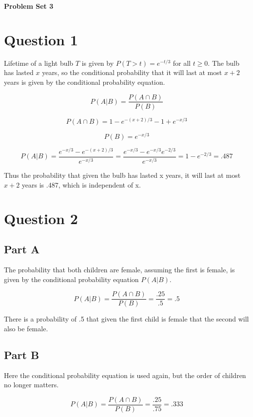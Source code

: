\documentclass[letterpaper]{article}
\begin{document}
\vspace*{6pt}

\noindent \textbf{\huge{Problem Set 3}}

\bigskip

\section*{Question 1}

Lifetime of a light bulb $T$ is given by $P(T>t)=e^{-t/3}$ for all $t \geq 0$. The bulb has lasted $x$ years, so the conditional probability that it will last at most $x + 2$ years is given by the conditional probability equation.

$$P(A|B) = \frac{P(A \cap B)}{P(B)}$$

$$P(A \cap B) = 1 - e^{-(x+2)/3} - 1 + e^{-x/3}$$

$$P(B) = e^{-x/3}$$

$$P(A|B) = \frac{e^{-x/3} - e^{-(x+2)/3}}{e^{-x/3}} = \frac{e^{-x/3} - e^{-x/3}e^{-2/3}}{e^{-x/3}} = 1 - e^{-2/3} = .487$$

\noindent Thus the probability that given the bulb has lasted x years, it will last at most $x + 2$ years is .487, which is independent of x.

\newpage

\section*{Question 2}

\subsection*{Part A}

The probability that both children are female, assuming the first is female, is given by the conditional probability equation $P(A|B)$.

$$P(A|B) = \frac{P(A \cap B)}{P(B)} = \frac{.25}{.5} = .5$$

\noindent There is a probability of .5 that given the first child is female that the second will also be female.

\subsection*{Part B}

Here the conditional probability equation is used again, but the order of  children no longer matters.

$$P(A|B) = \frac{P(A \cap B)}{P(B)} = \frac{.25}{.75} = .333$$
\end{document}
